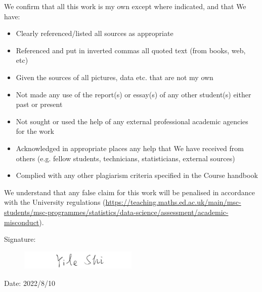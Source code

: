 \documentclass[11pt,twoside]{article}
\numberwithin{Theorem}{section}
\numberwithin{Definition}{section}
\numberwithin{Lemma}{section}
\numberwithin{Algorithm}{section}
\numberwithin{equation}{section}
\begin{document}
We confirm that all this work is my own except where indicated, and that We have:
\begin{itemize}
\item	Clearly referenced/listed all sources as appropriate	 				
\item	Referenced and put in inverted commas all quoted text (from books, web, etc)	
\item	Given the sources of all pictures, data etc. that are not my own				
\item	Not made any use of the report(s) or essay(s) of any other student(s) either past 	
or present	
\item	Not sought or used the help of any external professional academic agencies for the work
\item	Acknowledged in appropriate places any help that We have received from others	(e.g. fellow students, technicians, statisticians, external sources)
\item	Complied with any other plagiarism criteria specified in the Course handbook
\end{itemize}

We understand that any false claim for this work will be penalised in accordance with
the University regulations	(\url{https://teaching.maths.ed.ac.uk/main/msc-students/msc-programmes/statistics/data-science/assessment/academic-misconduct}).								

\vspace{1cm}

Signature:

\begin{figure}[!h]
	\includegraphics[width = 0.5\textwidth]{Images/Signature.png}
\end{figure}

\vspace{5mm}

Date: 2022/8/10

\clearpage


\pagestyle{plain}
\setcounter{page}{1}

\tableofcontents

\setcounter{page}{1}
\end{document}
